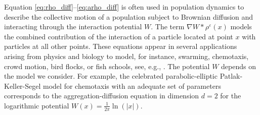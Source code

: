\documentclass[JEP,XML,SOM,Unicode, NoFloatCountersInSection,published]{cedram}
\def\eps{\varepsilon}
\theoremstyle{plain}
\theoremstyle{definition}
\begin{document}
Equation \eqref{eq:rho_diff}--\eqref{eq:arho_diff} is often used in population dynamics to describe the collective motion of a population subject to Brownian diffusion and interacting through the interaction potential $W$. The term $\nabla W * \rho^\eps(x)$ models the combined contribution of the interaction of a particle located at point $x$ with particles at all other points. These equations appear in several applications arising from physics and biology to model, for instance, swarming, chemotaxis, crowd motion, bird flocks, or fish schools, see, e.g., \cite{morale05, burger07,topaz06,topaz04,dolak05,JVChemotaxis}. The potential $W$ depends on the model we consider. For example, the celebrated parabolic-elliptic Patlak-Keller-Segel model \cite{keller71, keller71traveling} for chemotaxis with an adequate set of parameters corresponds to the aggregation-diffusion equation in dimension $d=2$ for the logarithmic potential $W(x) = \frac{1}{2\pi} \ln(|x|)$.
\end{document}
